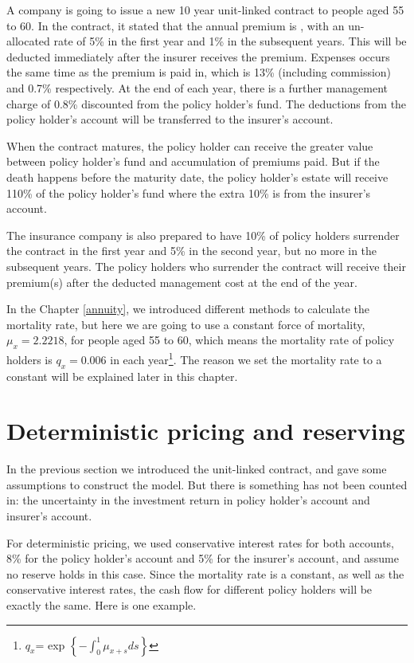 \documentclass{report}
\begin{document}
A company is going to issue a new 10 year unit-linked contract to people aged 55 to 60. In the contract, it stated that the annual premium is , with an un-allocated rate of 5\% in the first year and 1\% in the subsequent years. This will be deducted immediately after the insurer receives the premium. Expenses occurs the same time as the premium is paid in, which is 13\% (including commission) and 0.7\% respectively. At the end of each year, there is a further management charge of 0.8\%  discounted from the policy holder's fund. The deductions from the policy holder's account will be transferred to the insurer's account.

When the contract matures, the policy holder can receive the greater value between policy holder's fund and accumulation of premiums paid. But if the death happens before the maturity date, the policy holder's estate will receive 110\% of the policy holder's fund where the extra 10\% is from the insurer's account.

The insurance company is also prepared to have 10\% of policy holders surrender the contract in the first year and 5\% in the second year, but no more in the subsequent years. The policy holders who surrender the contract will receive their premium(s) after the deducted management cost at the end of the year.

In the Chapter \ref{annuity}, we introduced different methods to calculate the mortality rate, but here we are going to use a constant force of mortality, $\mu_x=2.2218$, for people aged 55 to 60, which means the mortality rate of policy holders is $q_x=0.006$ in each year\footnote{$q_x$= exp $\left\{-\int_0^1 \mu_{x+s}ds\right\}$}. The reason we set the mortality rate to a constant will be explained later in this chapter.  





\section{Deterministic pricing and reserving}

In the previous section we introduced the unit-linked contract, and gave some assumptions to construct the model. But there is something has not been counted in: the uncertainty in the investment return in policy holder's account and insurer's account. 

For deterministic pricing, we used conservative interest rates for both accounts, 8\% for the policy holder's account and 5\% for the insurer's account, and assume no reserve holds in this case. Since the mortality rate is a constant, as well as the conservative interest rates, the cash flow for different policy holders will be exactly the same. Here is one example.
\end{document}
